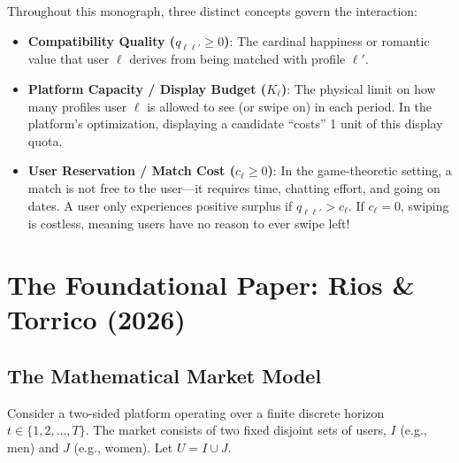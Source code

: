\documentclass[11pt,letterpaper]{article}
\theoremstyle{definition}
\theoremstyle{plain}
\theoremstyle{remark}
\begin{document}
\begin{takeawaybox}
Throughout this monograph, three distinct concepts govern the interaction:
\begin{itemize}[leftmargin=1.5em]
    \item \textbf{Compatibility Quality ($q_{\ell\ell'} \ge 0$)}: The cardinal happiness or romantic value that user $\ell$ derives from being matched with profile $\ell'$.
    \item \textbf{Platform Capacity / Display Budget ($K_\ell$)}: The physical limit on how many profiles user $\ell$ is allowed to see (or swipe on) in each period. In the platform's optimization, displaying a candidate ``costs'' 1 unit of this display quota.
    \item \textbf{User Reservation / Match Cost ($c_\ell \ge 0$)}: In the game-theoretic setting, a match is not free to the user—it requires time, chatting effort, and going on dates. A user only experiences positive surplus if $q_{\ell\ell'} > c_\ell$. If $c_\ell = 0$, swiping is costless, meaning users have no reason to ever swipe left!
\end{itemize}
\end{takeawaybox}

\newpage
\section{The Foundational Paper: Rios \& Torrico (2026)}
\label{sec:paper}

\subsection{The Mathematical Market Model}
Consider a two-sided platform operating over a finite discrete horizon $t \in \{1, 2, \dots, T\}$. The market consists of two fixed disjoint sets of users, $I$ (e.g., men) and $J$ (e.g., women). Let $U = I \cup J$.
\end{document}

